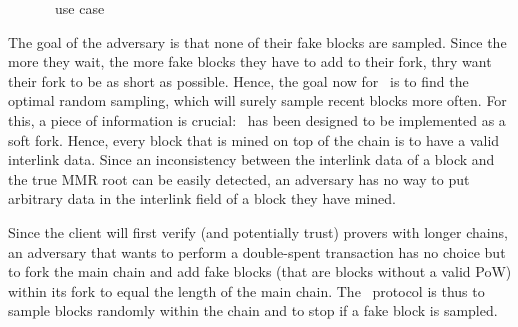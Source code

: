          \begin{figure}[ht]
          \centering
          \caption{\FC\ use case}
          \label{figure:fcusecase}
        \end{figure}
        
          The goal of the adversary is that none of their fake blocks are sampled. Since the more they wait, the more fake blocks they have to add to their fork, thry want their fork to be as short as possible. Hence, the goal now for \FC\ is to find the optimal random sampling, which will surely sample recent blocks more often. For this, a piece of information is crucial: \FC\ has been designed to be implemented as a soft fork. Hence, every block that is mined on top of the chain is to have a valid interlink data. Since an inconsistency between the interlink data of a block and the true MMR root can be easily detected, an adversary has no way to put arbitrary data in the interlink field of a block they have mined.
          
          Since the client will first verify (and potentially trust) provers with longer chains, an adversary that wants to perform a double-spent transaction has no choice but to fork the main chain and add fake blocks (that are blocks without a valid PoW) within its fork to equal the length of the main chain. The \FC\ protocol is thus to sample blocks randomly within the chain and to stop if a fake block is sampled.
          
